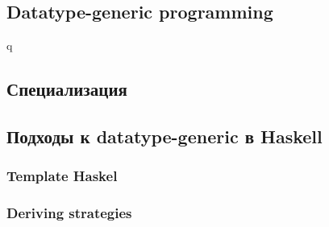 

\subsection{Datatype-generic programming}

q\cite{maguire-types}





\subsection{Специализация}








\subsection{Подходы к datatype-generic в Haskell}


\subsubsection{Template Haskel}






\subsubsection{Deriving strategies}

